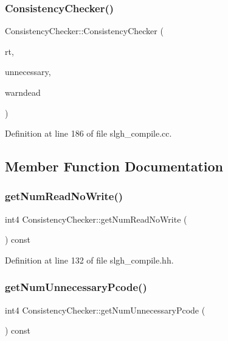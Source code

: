 \subsubsection{\texorpdfstring{ConsistencyChecker()}{ConsistencyChecker()}}
{\footnotesize\ttfamily Consistency\+Checker\+::\+Consistency\+Checker (\begin{DoxyParamCaption}\item[{\mbox{\hyperlink{class_subtable_symbol}{Subtable\+Symbol}} $\ast$}]{rt,  }\item[{bool}]{unnecessary,  }\item[{bool}]{warndead }\end{DoxyParamCaption})}



Definition at line 186 of file slgh\+\_\+compile.\+cc.



\subsection{Member Function Documentation}
\mbox{\label{class_consistency_checker_a45582b954c8fe61cf81e7c848a03dc4b}} 
\subsubsection{\texorpdfstring{getNumReadNoWrite()}{getNumReadNoWrite()}}
{\footnotesize\ttfamily int4 Consistency\+Checker\+::get\+Num\+Read\+No\+Write (\begin{DoxyParamCaption}\item[{void}]{ }\end{DoxyParamCaption}) const\hspace{0.3cm}{\ttfamily [inline]}}



Definition at line 132 of file slgh\+\_\+compile.\+hh.

\mbox{\label{class_consistency_checker_a22a41dd2a5e0787ac280d20528b4a9ef}} 
\subsubsection{\texorpdfstring{getNumUnnecessaryPcode()}{getNumUnnecessaryPcode()}}
{\footnotesize\ttfamily int4 Consistency\+Checker\+::get\+Num\+Unnecessary\+Pcode (\begin{DoxyParamCaption}\item[{void}]{ }\end{DoxyParamCaption}) const\hspace{0.3cm}{\ttfamily [inline]}}



